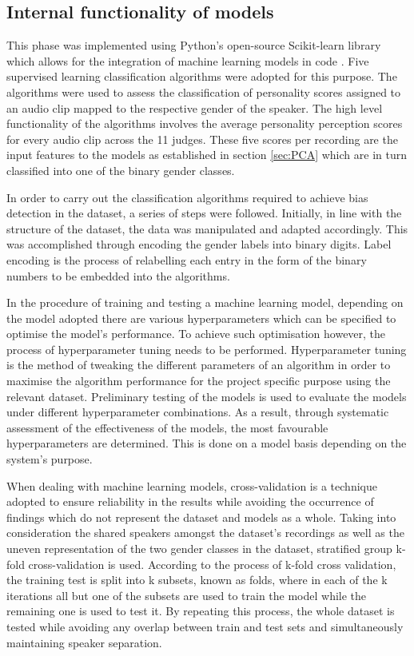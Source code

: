 \documentclass{l4proj}
\begin{document}
\subsection{Internal functionality of models}

This phase was implemented using Python's open-source Scikit-learn library which allows for the integration of machine learning models in code \citep{kramer2016scikit}. Five supervised learning classification algorithms were adopted for this purpose. The algorithms were used to assess the classification of personality scores assigned to an audio clip mapped to the respective gender of the speaker. The high level functionality of the algorithms involves the average personality perception scores for every audio clip across the 11 judges. These five scores per recording are the input features to the models as established in section \ref{sec:PCA} which are in turn classified into one of the binary gender classes.

In order to carry out the classification algorithms required to achieve bias detection in the dataset, a series of steps were followed.
Initially, in line with the structure of the dataset, the data was manipulated and adapted accordingly. This was accomplished through encoding the gender labels into binary digits. Label encoding is the process of relabelling each entry in the form of the binary numbers to be embedded into the algorithms.

In the procedure of training and testing a machine learning model, depending on the model adopted there are various hyperparameters which can be specified to optimise the model’s performance. To achieve such optimisation however, the process of hyperparameter tuning needs to be performed. Hyperparameter tuning is the method of tweaking the different parameters of an algorithm in order to maximise the algorithm performance for the project specific purpose using the relevant dataset. Preliminary testing of the models is used to evaluate the models under different hyperparameter combinations. As a result, through systematic assessment of the effectiveness of the models, the most favourable hyperparameters are determined. This is done on a model basis depending on the system’s purpose.

When dealing with machine learning models, cross-validation is a technique adopted to ensure reliability in the results while avoiding the occurrence of findings which do not represent the dataset and models as a whole.
Taking into consideration the shared speakers amongst the dataset’s recordings as well as the uneven representation of the two gender classes in the dataset, stratified group k-fold cross-validation is used. According to the process of k-fold cross validation, the training test is split into k subsets, known as folds, where in each of the k iterations all but one of the subsets are used to train the model while the remaining one is used to test it. By repeating this process, the whole dataset is tested while avoiding any overlap between train and test sets and simultaneously maintaining speaker separation.
\end{document}
